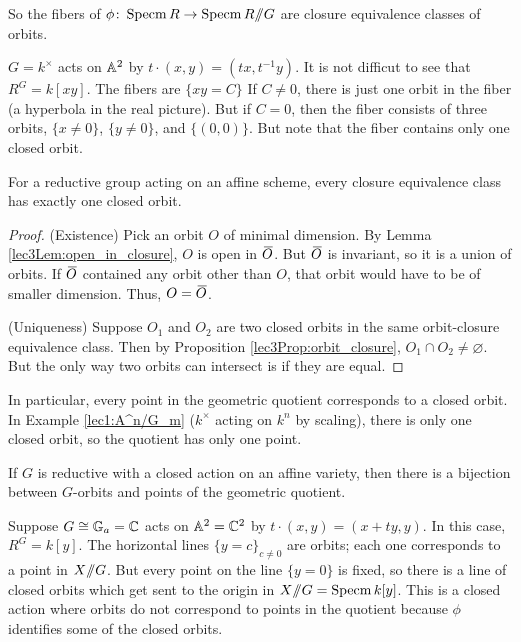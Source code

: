\begin{corollary}
 So the fibers of $\phi\colon \specm R\to \specm R\quot G$ are closure equivalence classes of orbits.
\end{corollary}
\begin{example}
 $G=k^\times$ acts on $\AA^2$ by $t\cdot (x,y)=(tx,t^{-1}y)$. It is not difficut to see that $R^G=k[xy]$. The fibers are $\{xy=C\}$ If $C\neq 0$, there is just one orbit in the fiber (a hyperbola in the real picture). But if $C=0$, then the fiber consists of three orbits, $\{x\neq 0\}$, $\{y\neq 0\}$, and $\{(0,0)\}$. But note that the fiber contains only one closed orbit.
\end{example}
\begin{proposition}
 For a reductive group acting on an affine scheme, every closure equivalence class has exactly one closed orbit.
\end{proposition}
\begin{proof}
 (Existence) Pick an orbit $O$ of minimal dimension. By Lemma \ref{lec3Lem:open_in_closure}, $O$ is open in $\bbar O$. But $\bbar O$ is invariant, so it is a union of orbits. If $\bbar O$ contained any orbit other than $O$, that orbit would have to be of smaller dimension. Thus, $O=\bbar O$.
 
 (Uniqueness) Suppose $O_1$ and $O_2$ are two closed orbits in the same orbit-closure equivalence class. Then by Proposition \ref{lec3Prop:orbit_closure}, $O_1\cap O_2\neq\varnothing$. But the only way two orbits can intersect is if they are equal.
\end{proof}
In particular, every point in the geometric quotient corresponds to a closed orbit. In Example \ref{lec1:A^n/G_m} ($k^\times$ acting on $k^n$ by scaling), there is only one closed orbit, so the quotient has only one point.

\begin{corollary}
 If $G$ is reductive with a closed action on an affine variety, then there is a bijection between $G$-orbits and points of the geometric quotient.
\end{corollary}

\begin{example}
 Suppose $G\cong \GG_a=\CC$ acts on $\AA^2=\CC^2$ by $t\cdot (x,y)=(x+ty,y)$. In this case, $R^G=k[y]$. The horizontal lines $\{y=c\}_{c\neq0}$ are orbits; each one corresponds to a point in $X\quot G$. But every point on the line $\{y=0\}$ is fixed, so there is a line of closed orbits which get sent to the origin in $X\quot G=\specm k[y]$. This is a closed action where orbits do not correspond to points in the quotient because $\phi$ identifies some of the closed orbits.
\end{example}

